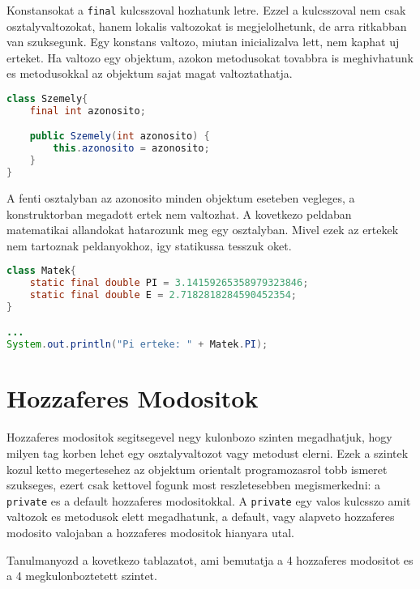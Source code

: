 \documentclass{article}
\let\l\lstinline
\begin{document}
Konstansokat a \l{final} kulcsszoval hozhatunk letre. Ezzel a kulcsszoval nem csak osztalyvaltozokat, hanem lokalis valtozokat is megjelolhetunk, de arra ritkabban van szuksegunk. Egy konstans valtozo, miutan inicializalva lett, nem kaphat uj erteket. Ha valtozo egy objektum, azokon metodusokat tovabbra is meghivhatunk es metodusokkal az objektum sajat magat valtoztathatja.

\begin{lstlisting}[language=Java, caption=Konstans]
class Szemely{
    final int azonosito;

    public Szemely(int azonosito) {
        this.azonosito = azonosito;
    }
}
\end{lstlisting}

A fenti osztalyban az azonosito minden objektum eseteben vegleges, a konstruktorban megadott ertek nem valtozhat. A kovetkezo peldaban matematikai allandokat hatarozunk meg egy osztalyban. Mivel ezek az ertekek nem tartoznak peldanyokhoz, igy statikussa tesszuk oket.

\begin{lstlisting}[language=Java, caption=Matematikai allandok]
class Matek{
    static final double PI = 3.14159265358979323846;
    static final double E = 2.7182818284590452354;
}

...
System.out.println("Pi erteke: " + Matek.PI);
\end{lstlisting}

\newpage

\section{Hozzaferes Modositok}

Hozzaferes modositok segitsegevel negy kulonbozo szinten megadhatjuk, hogy milyen tag korben lehet egy osztalyvaltozot vagy metodust elerni. Ezek a szintek kozul ketto megertesehez az objektum orientalt programozasrol tobb ismeret szukseges, ezert csak kettovel fogunk most reszletesebben megismerkedni: a \l{private} es a default hozzaferes modositokkal. A \l{private} egy valos kulcsszo amit valtozok es metodusok elett megadhatunk, a default, vagy alapveto hozzaferes modosito valojaban a hozzaferes modositok hianyara utal.

Tanulmanyozd a kovetkezo tablazatot, ami bemutatja a 4 hozzaferes modositot es a 4 megkulonboztetett szintet.
\end{document}
